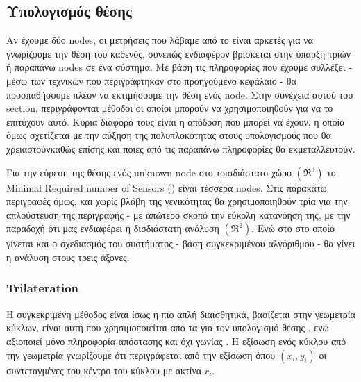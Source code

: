 \subsection{Υπολογισμός θέσης} \label{sec:Chapter3-2} %
Αν έχουμε δύο nodes, οι μετρήσεις που λάβαμε από το  είναι αρκετές για να γνωρίζουμε την θέση του καθενός,
συνεπώς ενδιαφέρον βρίσκεται στην ύπαρξη τριών ή παραπάνω nodes σε ένα σύστημα. Με βάση τις πληροφορίες που έχουμε συλλέξει - μέσω των τεχνικών που 
περιγράφτηκαν στο προηγούμενο κεφάλαιο - θα προσπαθήσουμε πλέον να εκτιμήσουμε την θέση ενός node. Στην συνέχεια αυτού του section, περιγράφονται μέθοδοι οι οποίοι μπορούν να χρησιμοποιηθούν για να το επιτύχουν
αυτό. Κύρια διαφορά τους είναι η απόδοση που μπορεί να έχουν, η οποία όμως σχετίζεται με την αύξηση της πολυπλοκότητας στους υπολογισμούς που θα
χρειαστούν\udot καθώς επίσης και ποιες από τις παραπάνω πληροφορίες θα εκμεταλλευτούν. 

Για την εύρεση της θέσης ενός unknown node στο τρισδιάστατο χώρο $(\mathfrak{R}^3)$ το Minimal Required number of Sensors () είναι τέσσερα nodes.
Στις παρακάτω περιγραφές όμως, και χωρίς βλάβη της γενικότητας θα χρησιμοποιηθούν τρία για την απλούστευση της περιγραφής - με απώτερο σκοπό την εύκολη κατανόηση της, με την παραδοχή ότι μας
ενδιαφέρει η δισδιάστατη ανάλυση $(\mathfrak{R}^2)$. Ενώ στο  στο οποίο γίνεται και ο σχεδιασμός του συστήματος - βάση συγκεκριμένου αλγόριθμου - 
θα γίνει η ανάλυση στους τρεις άξονες.

\subsubsection{Trilateration}
Η συγκεκριμένη μέθοδος είναι ίσως η πιο απλή διαισθητικά, βασίζεται στην γεωμετρία κύκλων, είναι αυτή που χρησιμοποιείται από τα 
για τον υπολογισμό θέσης \cite{trilateration-vs-triangulation-video}, ενώ αξιοποιεί μόνο πληροφορία απόστασης και όχι γωνίας \cite{Trilateration-vs-Triangulation}.
Η εξίσωση ενός κύκλου από την γεωμετρία γνωρίζουμε ότι περιγράφεται από την εξίσωση  όπου $(x_i,y_i)$ οι συντεταγμένες
του κέντρο του κύκλου με ακτίνα $r_i$.

